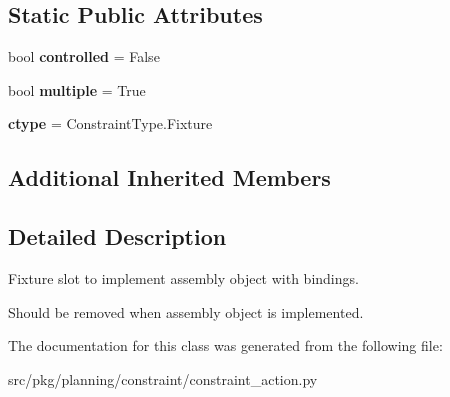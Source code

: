 \subsection*{Static Public Attributes}
\begin{DoxyCompactItemize}
\item 
\mbox{\label{classrnb-planning_1_1src_1_1pkg_1_1planning_1_1constraint_1_1constraint__action_1_1_fixture_slot_ab590f5e9ded7f5abe0ef18a9210e7b4b}} 
bool {\bfseries controlled} = False
\item 
\mbox{\label{classrnb-planning_1_1src_1_1pkg_1_1planning_1_1constraint_1_1constraint__action_1_1_fixture_slot_a01a38b073ed0aa656a3b3599be54e417}} 
bool {\bfseries multiple} = True
\item 
\mbox{\label{classrnb-planning_1_1src_1_1pkg_1_1planning_1_1constraint_1_1constraint__action_1_1_fixture_slot_a699b12039dc60e79a386bb245de15205}} 
{\bfseries ctype} = Constraint\+Type.\+Fixture
\end{DoxyCompactItemize}
\subsection*{Additional Inherited Members}


\subsection{Detailed Description}
Fixture slot to implement assembly object with bindings. 

Should be removed when assembly object is implemented. 

The documentation for this class was generated from the following file\+:\begin{DoxyCompactItemize}
\item 
src/pkg/planning/constraint/constraint\+\_\+action.\+py\end{DoxyCompactItemize}
